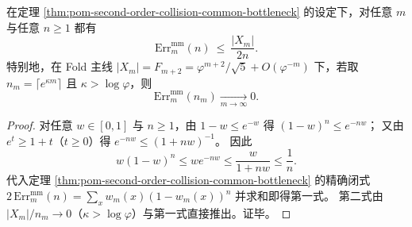 \begin{corollary}[支持规模上界与指数样本充分条件]\label{cor:pom-second-order-collision-minimax-err-support-bound}
在定理 \ref{thm:pom-second-order-collision-common-bottleneck} 的设定下，对任意 \(m\) 与任意 \(n\ge 1\) 都有
\[
\mathrm{Err}_m^{\mathrm{mm}}(n)\ \le\ \frac{|X_m|}{2n}.
\]
特别地，在 Fold 主线 \(|X_m|=F_{m+2}=\varphi^{m+2}/\sqrt5+O(\varphi^{-m})\) 下，若取 \(n_m=\lceil e^{\kappa m}\rceil\) 且 \(\kappa>\log\varphi\)，则
\[
\mathrm{Err}_m^{\mathrm{mm}}(n_m)\xrightarrow[m\to\infty]{}0.
\]
\end{corollary}
\begin{proof}
对任意 \(w\in[0,1]\) 与 \(n\ge 1\)，由 \(1-w\le e^{-w}\) 得 \((1-w)^n\le e^{-nw}\)；
又由 \(e^{t}\ge 1+t\)（\(t\ge 0\)）得 \(e^{-nw}\le (1+nw)^{-1}\)。
因此
\[
w(1-w)^n\le we^{-nw}\le \frac{w}{1+nw}\le \frac1n.
\]
代入定理 \ref{thm:pom-second-order-collision-common-bottleneck} 的精确闭式
\(
2\,\mathrm{Err}_m^{\mathrm{mm}}(n)=\sum_x w_m(x)(1-w_m(x))^n
\)
并求和即得第一式。
第二式由 \(|X_m|/n_m\to 0\)（\(\kappa>\log\varphi\)）与第一式直接推出。证毕。
\end{proof}

\endinput
